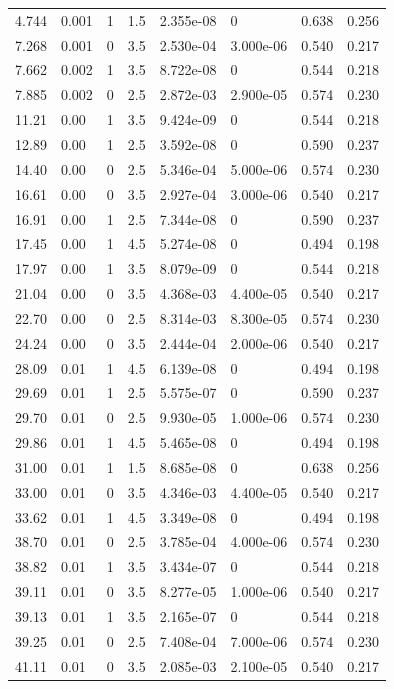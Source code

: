 \documentclass[preview]{standalone}
\begin{document}
{{\begin{tabular}{L{1.2cm}C{1.2cm} C{0.3cm}C{0.5cm} C{1.4cm}C{1.4cm} C{1.4cm}C{1.4cm}}
  4.744  &  0.001  & 1     & 1.5 &  2.355e-08  & 0  & 0.638 &  0.256   \\ 
  7.268  &  0.001  & 0     & 3.5 &  2.530e-04  & 3.000e-06  & 0.540 &  0.217   \\ 
  7.662  &  0.002  & 1     & 3.5 &  8.722e-08  & 0  & 0.544 &  0.218   \\ 
  7.885  &  0.002  & 0     & 2.5 &  2.872e-03  & 2.900e-05  & 0.574 &  0.230   \\ 
  11.21  &  0.00  & 1     & 3.5 &  9.424e-09  & 0  & 0.544 &  0.218   \\ 
  12.89  &  0.00  & 1     & 2.5 &  3.592e-08  & 0  & 0.590 &  0.237   \\ 
  14.40  &  0.00  & 0     & 2.5 &  5.346e-04  & 5.000e-06  & 0.574 &  0.230   \\ 
  16.61  &  0.00  & 0     & 3.5 &  2.927e-04  & 3.000e-06  & 0.540 &  0.217   \\ 
  16.91  &  0.00  & 1     & 2.5 &  7.344e-08  & 0  & 0.590 &  0.237   \\ 
  17.45  &  0.00  & 1     & 4.5 &  5.274e-08  & 0  & 0.494 &  0.198   \\ 
  17.97  &  0.00  & 1     & 3.5 &  8.079e-09  & 0  & 0.544 &  0.218   \\ 
  21.04  &  0.00  & 0     & 3.5 &  4.368e-03  & 4.400e-05  & 0.540 &  0.217   \\ 
  22.70  &  0.00  & 0     & 2.5 &  8.314e-03  & 8.300e-05  & 0.574 &  0.230   \\ 
  24.24  &  0.00  & 0     & 3.5 &  2.444e-04  & 2.000e-06  & 0.540 &  0.217   \\ 
  28.09  &  0.01  & 1     & 4.5 &  6.139e-08  & 0  & 0.494 &  0.198   \\ 
  29.69  &  0.01  & 1     & 2.5 &  5.575e-07  & 0  & 0.590 &  0.237   \\ 
  29.70  &  0.01  & 0     & 2.5 &  9.930e-05  & 1.000e-06  & 0.574 &  0.230   \\ 
  29.86  &  0.01  & 1     & 4.5 &  5.465e-08  & 0  & 0.494 &  0.198   \\ 
  31.00  &  0.01  & 1     & 1.5 &  8.685e-08  & 0  & 0.638 &  0.256   \\ 
  33.00  &  0.01  & 0     & 3.5 &  4.346e-03  & 4.400e-05  & 0.540 &  0.217   \\ 
  33.62  &  0.01  & 1     & 4.5 &  3.349e-08  & 0  & 0.494 &  0.198   \\ 
  38.70  &  0.01  & 0     & 2.5 &  3.785e-04  & 4.000e-06  & 0.574 &  0.230   \\ 
  38.82  &  0.01  & 1     & 3.5 &  3.434e-07  & 0  & 0.544 &  0.218   \\ 
  39.11  &  0.01  & 0     & 3.5 &  8.277e-05  & 1.000e-06  & 0.540 &  0.217   \\ 
  39.13  &  0.01  & 1     & 3.5 &  2.165e-07  & 0  & 0.544 &  0.218   \\ 
  39.25  &  0.01  & 0     & 2.5 &  7.408e-04  & 7.000e-06  & 0.574 &  0.230   \\ 
  41.11  &  0.01  & 0     & 3.5 &  2.085e-03  & 2.100e-05  & 0.540 &  0.217   \\ 
\hline 
\end{tabular} 

}}
\end{document}
